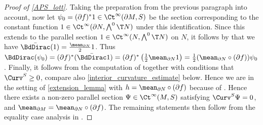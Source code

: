 \documentclass[a4paper,11pt]{amsart}
\numberwithin{equation}{section}
\begin{document}
\begin{proof}[Proof of \cref{APS_lott}]
    Taking the preparation from the previous paragraph into account, now let \(\psi_0 = (\partial f)^\ast 1 \in \Ct^\infty(\partial M, S)\) be the section corresponding to the constant function \(1 \in \Ct^\infty(\partial N, \bigwedge^0 \T N)\) under this identification.
    Since this extends to the parallel section \(1 \in \Ct^\infty(N, \bigwedge^0 \T N)\) on \(N\), it follows by  that we have \(\bar{\BdDirac}(1) = \frac{\mean_{\partial N}}{2} 1\).
     Thus \(\BdDirac(\psi_0) = (\partial f)^\ast (\bar{\BdDirac} 1) = (\partial f)^\ast \left( \frac{1}{2}\mean_{\partial N} 1\right) = \frac{1}{2}(\mean_{\partial N} \circ (\partial f)) \psi_0\).
    Finally, it follows from the computation of \textcite[Lemma~1.1]{GoetteSemmelmann} together with conditions  that \(\Curv^S \geq 0\), compare also \cref{interior_curvature_estimate} below.
    Hence we are in the setting of \cref{extension_lemma} with \(h = \mean_{\partial N} \circ (\partial f)\) because of .
    Hence there exists a non-zero parallel section \(\Psi \in \Ct^\infty(M, S)\) satisfying \(\Curv^S \Psi = 0\), and \(\mean_{\partial M} = \mean_{\partial N} \circ (\partial f)\).
    The remaining statements then follow from the equality case analysis in \textcite{GoetteSemmelmann,Lott}.
\end{proof}
\end{document}
